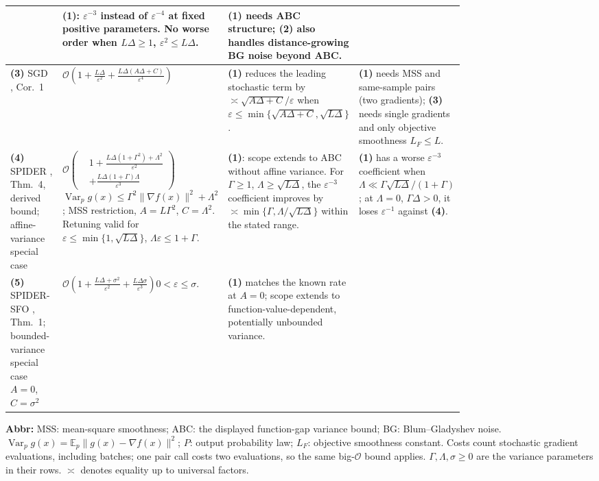 \begin{table}[tp]
\begin{threeparttable}
\begin{tabularx}{\linewidth}{@{}>{\raggedright\arraybackslash}p{0.20\linewidth}>{\raggedright\arraybackslash}p{0.32\linewidth}>{\raggedright\arraybackslash}p{0.25\linewidth}>{\raggedright\arraybackslash}X@{}}
& \textbf{(1)}: $\varepsilon^{-3}$ instead of $\varepsilon^{-4}$ at fixed positive parameters. No worse order when $L\Delta\geq1$, $\varepsilon^2\leq L\Delta$.
& \textbf{(1)} needs ABC structure; \textbf{(2)} also handles distance-growing BG noise beyond ABC. \\
\midrule
\textbf{(3)} SGD \citep{ESNKhaled2020v3}, Cor.~1
& $\mathcal{O}\!\left(1+\frac{L\Delta}{\varepsilon^2}+\frac{L\Delta(A\Delta+C)}{\varepsilon^4}\right)$
& \textbf{(1)} reduces the leading stochastic term by $\asymp\sqrt{A\Delta+C}/\varepsilon$ when $\varepsilon\leq\min\{\sqrt{A\Delta+C},\sqrt{L\Delta}\}$.
& \textbf{(1)} needs MSS and same-sample pairs (two gradients); \textbf{(3)} needs single gradients and only objective smoothness $L_F\leq L$. \\
\midrule
\textbf{(4)} SPIDER \citep{ESNChen2023}, Thm.~4, derived bound; affine-variance special case
& $\mathcal{O}\!\left(\begin{aligned}&1+\frac{L\Delta(1+\Gamma^2)+\Lambda^2}{\varepsilon^2}\\&+\frac{L\Delta(1+\Gamma)\Lambda}{\varepsilon^3}\end{aligned}\right)$\newline $\operatorname{Var}_p g(x)\leq\Gamma^2\|\nabla f(x)\|^2+\Lambda^2$; MSS restriction, $A=L\Gamma^2$, $C=\Lambda^2$. Retuning valid for $\varepsilon\leq\min\{1,\sqrt{L\Delta}\}$, $\Lambda\varepsilon\leq1+\Gamma$.
& \textbf{(1)}: scope extends to ABC without affine variance. For $\Gamma\geq1$, $\Lambda\geq\sqrt{L\Delta}$, the $\varepsilon^{-3}$ coefficient improves by $\asymp\min\{\Gamma,\Lambda/\sqrt{L\Delta}\}$ within the stated range.
& \textbf{(1)} has a worse $\varepsilon^{-3}$ coefficient when $\Lambda\ll\Gamma\sqrt{L\Delta}/(1+\Gamma)$; at $\Lambda=0$, $\Gamma\Delta>0$, it loses $\varepsilon^{-1}$ against \textbf{(4)}. \\
\midrule
\textbf{(5)} SPIDER-SFO \citep{ESNFang2018v2}, Thm.~1; bounded-variance special case $A=0$, $C=\sigma^2$
& $\mathcal{O}\!\left(1+\frac{L\Delta+\sigma^2}{\varepsilon^2}+\frac{L\Delta\sigma}{\varepsilon^3}\right)$\newline $0<\varepsilon\leq\sigma$.
& \textbf{(1)} matches the known rate at $A=0$; scope extends to function-value-dependent, potentially unbounded variance.
& \\
\bottomrule
\end{tabularx}
\begin{tablenotes}[flushleft]\footnotesize
\item[] \textbf{Abbr:} MSS: mean-square smoothness; ABC: the displayed function-gap variance bound; BG: Blum--Gladyshev noise. $\operatorname{Var}_p g(x)=\mathbb E_p\|g(x)-\nabla f(x)\|^2$; $P$: output probability law; $L_F$: objective smoothness constant. Costs count stochastic gradient evaluations, including batches; one pair call costs two evaluations, so the same big-$\mathcal{O}$ bound applies. $\Gamma,\Lambda,\sigma\geq0$ are the variance parameters in their rows. $\asymp$ denotes equality up to universal factors.

\end{tablenotes}
\end{threeparttable}
\end{table}

